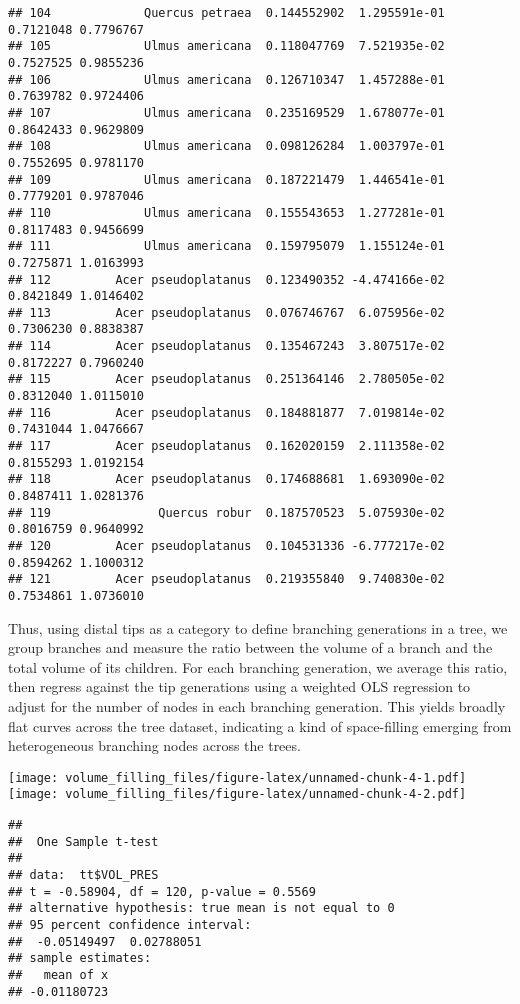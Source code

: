 \documentclass[]{article}
\begin{document}
\begin{verbatim}
## 104             Quercus petraea  0.144552902  1.295591e-01 0.7121048 0.7796767
## 105             Ulmus americana  0.118047769  7.521935e-02 0.7527525 0.9855236
## 106             Ulmus americana  0.126710347  1.457288e-01 0.7639782 0.9724406
## 107             Ulmus americana  0.235169529  1.678077e-01 0.8642433 0.9629809
## 108             Ulmus americana  0.098126284  1.003797e-01 0.7552695 0.9781170
## 109             Ulmus americana  0.187221479  1.446541e-01 0.7779201 0.9787046
## 110             Ulmus americana  0.155543653  1.277281e-01 0.8117483 0.9456699
## 111             Ulmus americana  0.159795079  1.155124e-01 0.7275871 1.0163993
## 112         Acer pseudoplatanus  0.123490352 -4.474166e-02 0.8421849 1.0146402
## 113         Acer pseudoplatanus  0.076746767  6.075956e-02 0.7306230 0.8838387
## 114         Acer pseudoplatanus  0.135467243  3.807517e-02 0.8172227 0.7960240
## 115         Acer pseudoplatanus  0.251364146  2.780505e-02 0.8312040 1.0115010
## 116         Acer pseudoplatanus  0.184881877  7.019814e-02 0.7431044 1.0476667
## 117         Acer pseudoplatanus  0.162020159  2.111358e-02 0.8155293 1.0192154
## 118         Acer pseudoplatanus  0.174688681  1.693090e-02 0.8487411 1.0281376
## 119               Quercus robur  0.187570523  5.075930e-02 0.8016759 0.9640992
## 120         Acer pseudoplatanus  0.104531336 -6.777217e-02 0.8594262 1.1000312
## 121         Acer pseudoplatanus  0.219355840  9.740830e-02 0.7534861 1.0736010
\end{verbatim}

Thus, using distal tips as a category to define branching generations in
a tree, we group branches and measure the ratio between the volume of a
branch and the total volume of its children. For each branching
generation, we average this ratio, then regress against the tip
generations using a weighted OLS regression to adjust for the number of
nodes in each branching generation. This yields broadly flat curves
across the tree dataset, indicating a kind of space-filling emerging
from heterogeneous branching nodes across the trees.

\texttt{[image: volume\_filling\_files/figure-latex/unnamed-chunk-4-1.pdf]}
\texttt{[image: volume\_filling\_files/figure-latex/unnamed-chunk-4-2.pdf]}

\begin{verbatim}
## 
##  One Sample t-test
## 
## data:  tt$VOL_PRES
## t = -0.58904, df = 120, p-value = 0.5569
## alternative hypothesis: true mean is not equal to 0
## 95 percent confidence interval:
##  -0.05149497  0.02788051
## sample estimates:
##   mean of x 
## -0.01180723
\end{verbatim}
\end{document}
